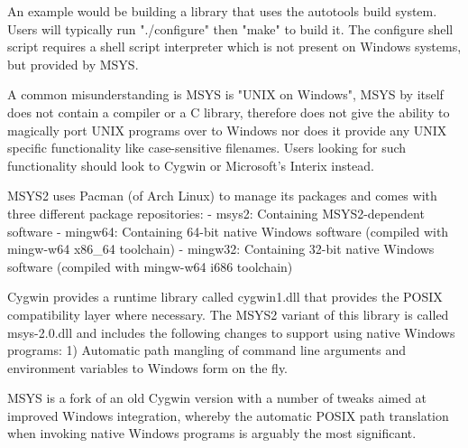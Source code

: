 \documentclass[../LabBook]{subfiles}
\begin{document}
    An example would be building a library that uses the autotools build system. Users will typically run "./configure" then "make" to build it.
    The configure shell script requires a shell script interpreter which is not present on Windows systems, but provided by MSYS.


    A common misunderstanding is MSYS is "UNIX on Windows", MSYS by itself
    does not contain a compiler or a C library, therefore does not give the
    ability to magically port UNIX programs over to Windows nor does it provide any UNIX specific functionality
    like case-sensitive filenames. Users looking for such functionality
    should look to Cygwin or Microsoft's Interix instead.


    MSYS2 uses Pacman (of Arch Linux) to manage its packages and comes with three different package repositories:
    - msys2: Containing MSYS2-dependent software
    - mingw64: Containing 64-bit native Windows software (compiled with mingw-w64 x86_64 toolchain)
    - mingw32: Containing 32-bit native Windows software (compiled with mingw-w64 i686 toolchain)


    Cygwin provides a runtime library called cygwin1.dll that provides the POSIX compatibility layer
    where necessary. The MSYS2 variant of this library
    is called msys-2.0.dll and includes the following changes to support using native Windows programs:
    1) Automatic path mangling of command line arguments and environment variables to Windows form on the fly.

    MSYS is a fork of an old Cygwin version with a number of tweaks
    aimed at improved Windows integration, whereby the automatic POSIX path
    translation when invoking native Windows programs is arguably the most significant.
\end{document}
